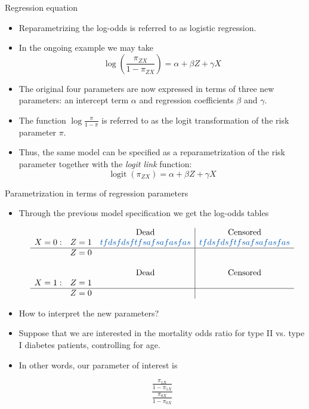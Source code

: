 \documentclass[10pt,handout]{beamer}\usepackage[]{graphicx}\usepackage[]{color}
\begin{document}
\begin{frame}{Regression equation}
	\begin{itemize}
		\item Reparametrizing the log-odds is referred to as logistic regression.
		\item In the ongoing example we may take
		$$
		\log \left(\frac{\pi_{Z X}}{1-\pi_{Z X}}\right)=\alpha+\beta Z+\gamma X
		$$
		\item The original four parameters are now expressed in terms of three new parameters: an intercept term $\alpha$ and regression coefficients $\beta$ and $\gamma$.
		\item The function $\log \frac{\pi}{1-\pi}$ is referred to as the logit transformation of the risk parameter $\pi$.
		\item Thus, the same model can be specified as a reparametrization of the risk parameter together with the \textit{logit link} function:
		$$
		\operatorname{logit}\left(\pi_{Z X}\right)=\alpha+\beta Z+\gamma X
		$$
	\end{itemize}
\end{frame}





\begin{frame}{Parametrization in terms of regression parameters}
	\begin{itemize}
		\item Through the previous model specification we get the
		log-odds tables
		
				$$
		\begin{array}{llc|c} 
		&      & \text { Dead } & \text { Censored } \\
		X=0: & Z=1 & \textcolor{white}{tfdsfdsftfsafsafasfas} & \textcolor{white}{tfdsfdsftfsafsafasfas} \\
		\hline
		& Z=0 &  &  \\
		& & & \\
		&  & \text { Dead } & \text { Censored } \\
		X=1:&  Z=1 &  &  \\
				\hline
		&  Z=0    &  & 
		\end{array}
		$$
		
		\item How to interpret the new parameters?
		\item Suppose that we are interested in the mortality odds ratio for type II vs. type I diabetes patients, controlling for age.
		\item In other words, our parameter of interest is
		
		$$
		\frac{\frac{\pi_{1X}}{1-\pi_{1X}}}{\frac{\pi_{0X}}{1-\pi_{0X}}}
		$$
		
				
	\end{itemize}
\end{frame}
\end{document}
